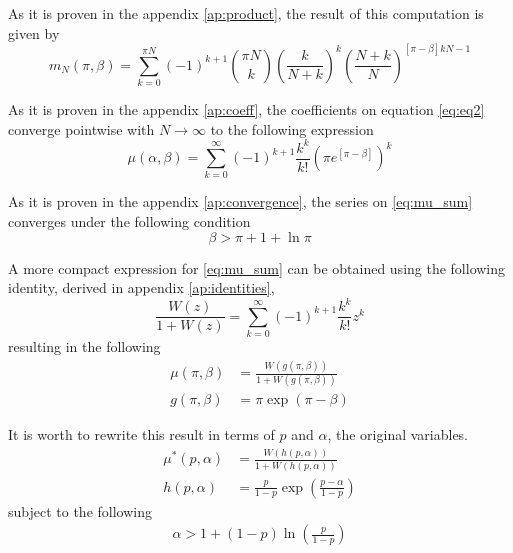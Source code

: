 \documentclass{article}
\newcommand{\ppar}[1]{\left( #1 \right)}
\newcommand{\spar}[1]{\left[ #1 \right]}
\begin{document}
As it is proven in the appendix \ref{ap:product}, the result of this computation is given by
\begin{equation}
m_N(\pi, \beta) =
    \sum_{k=0}^{\pi N}
    (-1)^{k+1} 
    \binom{\pi N}{k}
    \ppar{\frac{k}{N+k}}^k
    \ppar{\frac{N+k}{N}}^{\spar{\pi-\beta}k N -1}
    \label{eq:eq2}
\end{equation}

As it is proven in the appendix \ref{ap:coeff}, the coefficients on equation \eqref{eq:eq2} converge pointwise with $N\rightarrow \infty$ to the following expression
\begin{equation}
    \mu(\alpha, \beta) =
    \sum_{k=0}^{\infty}
    (-1)^{k+1} \frac{k^k}{k!} 
    \ppar{\pi
    e^{\spar{\pi-\beta}} }^k
    \label{eq:mu_sum}
\end{equation}

As it is proven in the appendix \ref{ap:convergence},
the series on \eqref{eq:mu_sum} converges under the following condition
\begin{equation}
    \beta > \pi + 1 + \ln{\pi}
\end{equation}

A more compact expression for \eqref{eq:mu_sum} can be obtained using the following identity, derived in appendix \ref{ap:identities},
\begin{equation}
    \frac{W\ppar{z}}{1+W\ppar{z}}
    =
    \sum_{k=0}^{\infty}
    (-1)^{k+1} \frac{k^k}{k!} 
    z^k
\end{equation}
resulting in the following 
\begin{align}
    \mu\ppar{\pi, \beta} &= \frac{W\ppar{g\ppar{\pi, \beta}}}{1+W\ppar{g\ppar{\pi, \beta}}}
    \\
    g\ppar{\pi, \beta} &=
    \pi \exp{\ppar{\pi - \beta}}
\end{align}

It is worth to rewrite this result in terms of $p$ and $\alpha$, the original variables.
\begin{align}
    {\mu^*}\ppar{p, \alpha} &= \frac{W\ppar{h\ppar{p, \alpha}}}{1+W\ppar{h\ppar{p, \alpha}}}
    \label{eq:final1}
    \\
    h\ppar{p, \alpha} &=
    \frac{p}{1-p} \exp{\ppar{\frac{p-\alpha}{1-p}}}
    \label{eq:final2}
\end{align}
subject to the following
\begin{align}
    \alpha > 1 + \ppar{1-p} \ln{\ppar{\frac{p}{1-p}}} 
    \label{eq:conv_og}
\end{align}
\end{document}
